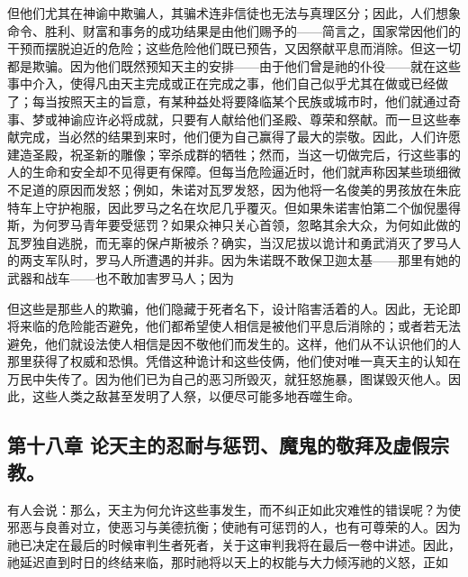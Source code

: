 但他们尤其在神谕中欺骗人，其骗术连非信徒也无法与真理区分；因此，人们想象命令、胜利、财富和事务的成功结果是由他们赐予的——简言之，国家常因他们的干预而摆脱迫近的危险；这些危险他们既已预告，又因祭献平息而消除。但这一切都是欺骗。因为他们既然预知天主的安排——由于他们曾是祂的仆役——就在这些事中介入，使得凡由天主完成或正在完成之事，他们自己似乎尤其在做或已经做了；每当按照天主的旨意，有某种益处将要降临某个民族或城市时，他们就通过奇事、梦或神谕应许必将成就，只要有人献给他们圣殿、尊荣和祭献。而一旦这些奉献完成，当必然的结果到来时，他们便为自己赢得了最大的崇敬。因此，人们许愿建造圣殿，祝圣新的雕像；宰杀成群的牺牲；然而，当这一切做完后，行这些事的人的生命和安全却不见得更有保障。但每当危险逼近时，他们就声称因某些琐细微不足道的原因而发怒；例如，朱诺对瓦罗发怒，因为他将一名俊美的男孩放在朱庇特车上守护袍服，因此罗马之名在坎尼几乎覆灭。但如果朱诺害怕第二个伽倪墨得斯，为何罗马青年要受惩罚？如果众神只关心首领，忽略其余大众，为何如此做的瓦罗独自逃脱，而无辜的保卢斯被杀？确实，当汉尼拔以诡计和勇武消灭了罗马人的两支军队时，罗马人所遭遇的并非。因为朱诺既不敢保卫迦太基——那里有她的武器和战车——也不敢加害罗马人；因为\par

\par

但这些是那些人的欺骗，他们隐藏于死者名下，设计陷害活着的人。因此，无论即将来临的危险能否避免，他们都希望使人相信是被他们平息后消除的；或者若无法避免，他们就设法使人相信是因不敬他们而发生的。这样，他们从不认识他们的人那里获得了权威和恐惧。凭借这种诡计和这些伎俩，他们使对唯一真天主的认知在万民中失传了。因为他们已为自己的恶习所毁灭，就狂怒施暴，图谋毁灭他人。因此，这些人类之敌甚至发明了人祭，以便尽可能多地吞噬生命。\par


\subsection{第十八章  论天主的忍耐与惩罚、魔鬼的敬拜及虚假宗教。}

有人会说：那么，天主为何允许这些事发生，而不纠正如此灾难性的错误呢？为使邪恶与良善对立，使恶习与美德抗衡；使祂有可惩罚的人，也有可尊荣的人。因为祂已决定在最后的时候审判生者死者，关于这审判我将在最后一卷中讲述。因此，祂延迟直到时日的终结来临，那时祂将以天上的权能与大力倾泻祂的义怒，正如\par

